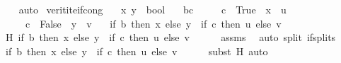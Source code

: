 \begin{isabellebody}
%
\isadelimproof
\ \ %
\endisadelimproof
%
\isatagproof
{}\isamarkupfalse%
\ auto%
\endisatagproof
{\isafoldproof}%
%
\isadelimproof
\isanewline
%
\endisadelimproof
\isanewline
{}\isamarkupfalse%
\ verit{\isacharunderscore}{\kern0pt}ite{\isacharunderscore}{\kern0pt}if{\isacharunderscore}{\kern0pt}cong{\isacharcolon}{\kern0pt}\isanewline
\ \ \ x\ y\ {\isacharcolon}{\kern0pt}{\isacharcolon}{\kern0pt}\ bool\isanewline
\ \ \ {\isachardoublequoteopen}b{\isacharequal}{\kern0pt}c{\isachardoublequoteclose}\isanewline
\ \ \ \ \ {\isachardoublequoteopen}c\ {\isasymequiv}\ True\ {\isasymLongrightarrow}\ x\ {\isacharequal}{\kern0pt}\ u{\isachardoublequoteclose}\isanewline
\ \ \ \ \ {\isachardoublequoteopen}c\ {\isasymequiv}\ False\ {\isasymLongrightarrow}\ y\ {\isacharequal}{\kern0pt}\ v{\isachardoublequoteclose}\isanewline
\ \ \ {\isachardoublequoteopen}{\isacharparenleft}{\kern0pt}if\ b\ then\ x\ else\ y{\isacharparenright}{\kern0pt}\ {\isasymequiv}\ {\isacharparenleft}{\kern0pt}if\ c\ then\ u\ else\ v{\isacharparenright}{\kern0pt}{\isachardoublequoteclose}\isanewline
%
\isadelimproof
%
\endisadelimproof
%
\isatagproof
{}\isamarkupfalse%
\ {\isacharminus}{\kern0pt}\isanewline
\ \ \isamarkupfalse%
\ H{\isacharcolon}{\kern0pt}\ {\isachardoublequoteopen}{\isacharparenleft}{\kern0pt}if\ b\ then\ x\ else\ y{\isacharparenright}{\kern0pt}\ {\isacharequal}{\kern0pt}\ {\isacharparenleft}{\kern0pt}if\ c\ then\ u\ else\ v{\isacharparenright}{\kern0pt}{\isachardoublequoteclose}\isanewline
\ \ \ \ \isamarkupfalse%
\ assms\ \isamarkupfalse%
\ {\isacharparenleft}{\kern0pt}auto\ split{\isacharcolon}{\kern0pt}\ if{\isacharunderscore}{\kern0pt}splits{\isacharparenright}{\kern0pt}\isanewline
\isanewline
\ \ \isamarkupfalse%
\ {\isachardoublequoteopen}{\isacharparenleft}{\kern0pt}if\ b\ then\ x\ else\ y{\isacharparenright}{\kern0pt}\ {\isasymequiv}\ {\isacharparenleft}{\kern0pt}if\ c\ then\ u\ else\ v{\isacharparenright}{\kern0pt}{\isachardoublequoteclose}\isanewline
\ \ \ \ \isamarkupfalse%
\ {\isacharparenleft}{\kern0pt}subst\ H{\isacharparenright}{\kern0pt}\ auto\isanewline
{}\isamarkupfalse%
%
\endisatagproof
{\isafoldproof}%
%
\isadelimproof
%
\endisadelimproof
%
\isadelimdocument
%
\endisadelimdocument
%
\isatagdocument
%
\isamarkuptrue%
%
\endisatagdocument
{\isafolddocument}%
%
\isadelimdocument
%
\endisadelimdocument
%
\isadelimML

\end{isabellebody}
